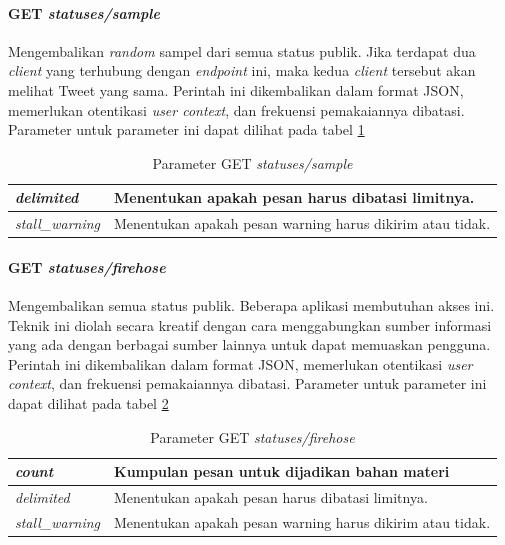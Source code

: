 \paragraph{GET \textit{statuses/sample}}
Mengembalikan \textit{random} sampel dari semua status publik. Jika terdapat dua \textit{client} yang terhubung dengan \textit{endpoint} ini, maka kedua \textit{client} tersebut akan melihat Tweet yang sama. Perintah ini dikembalikan dalam format JSON, memerlukan otentikasi \textit{user context}, dan frekuensi pemakaiannya dibatasi. Parameter untuk parameter ini dapat dilihat pada tabel \ref{table:ParameterGetStatusesSample}

\begin{table}[h]
\begin{tabular}{|l|l|}
\hline
\textit{delimited}          & Menentukan apakah pesan harus dibatasi limitnya. \\ \hline
\textit{stall\_warning}           & Menentukan apakah pesan warning harus dikirim atau tidak.                \\   \hline          
\end{tabular}
\caption{Parameter GET \textit{statuses/sample}}
\label{table:ParameterGetStatusesSample}
\end{table}


\paragraph{GET \textit{statuses/firehose}}
Mengembalikan semua status publik. Beberapa aplikasi membutuhan akses ini. Teknik ini diolah secara kreatif dengan cara menggabungkan sumber informasi yang ada dengan berbagai sumber lainnya untuk dapat memuaskan pengguna. Perintah ini dikembalikan dalam format JSON, memerlukan otentikasi \textit{user context}, dan frekuensi pemakaiannya dibatasi. Parameter untuk parameter ini dapat dilihat pada tabel \ref{table:ParameterGetStatusesFirehose}


\begin{table}[h]
\begin{tabular}{|l|l|}
\hline
\textit{count} & Kumpulan pesan untuk dijadikan bahan materi \\ \hline
\textit{delimited}          & Menentukan apakah pesan harus dibatasi limitnya. \\ \hline
\textit{stall\_warning}           & Menentukan apakah pesan warning harus dikirim atau tidak.                \\     \hline        
\end{tabular}
\caption{Parameter GET \textit{statuses/firehose}}
\label{table:ParameterGetStatusesFirehose}
\end{table}


